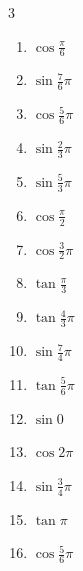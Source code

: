 \begin{multicols}{3}
\begin{enumerate}
  \item $\displaystyle \cos{\frac{\pi}{6}}$

  \item $\displaystyle \sin{\frac{7}{6}\pi}$

  \item $\displaystyle \cos{\frac{5}{6}\pi}$

  \item $\displaystyle \sin{\frac{2}{3}\pi}$

  \item $\displaystyle \sin{\frac{5}{3}\pi}$

  \item $\displaystyle \cos{\frac{\pi}{2}}$
        \phantom{$\displaystyle =0$}

  \item $\displaystyle \cos{\frac{3}{2}\pi}$
        \phantom{$\displaystyle =0$}

  \item $\displaystyle \tan{\frac{\pi}{3}}$

  \item $\displaystyle \tan{\frac{4}{3}\pi}$

  \item $\displaystyle \sin{\frac{7}{4}\pi}$

  \item $\displaystyle \tan{\frac{5}{6}\pi}$

  \item $\displaystyle \sin{0}$
        \phantom{$\displaystyle =0$}

  \item $\displaystyle \cos{2\pi}$
        \phantom{$\displaystyle =1$}

  \item $\displaystyle \sin{\frac{3}{4}\pi}$

  \item $\displaystyle \tan{\pi}$
        \phantom{$\displaystyle =0$}

  \item $\displaystyle \cos{\frac{5}{6}\pi}$


\end{enumerate}
\end{multicols}
